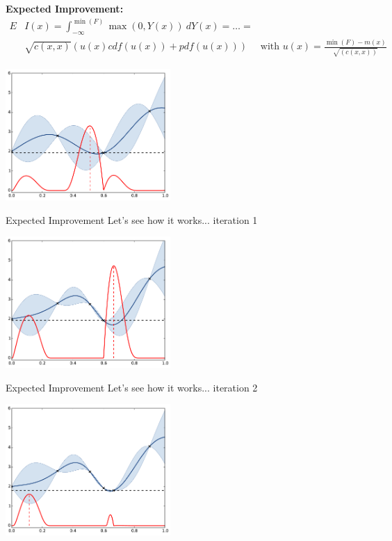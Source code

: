 \begin{frame}{}
\textbf{Expected Improvement:}
\begin{equation*}
\begin{split}
E&I(x) =  \int_{-\infty}^{\min(F)} \max\left(0,Y(x)\right) ~dY(x) = \dots = \\
& \sqrt{c(x,x)} (u(x) cdf(u(x)) + pdf(u(x))) \quad \text{ with } u(x) = \frac{\min(F) - m(x)}{\sqrt{(c(x,x))}}
\end{split}
\end{equation*}
\begin{center}
\includegraphics[height=5cm]{4_optimization/figures/python/ego_EI0}
\end{center}
\end{frame}

\begin{frame}{Expected Improvement}
Let's see how it works... iteration 1
\begin{center}
\includegraphics[height=5cm]{4_optimization/figures/python/ego_EI1}
\end{center}
\end{frame}

\begin{frame}[noframenumbering]{Expected Improvement}
Let's see how it works... iteration 2
\begin{center}
\includegraphics[height=5cm]{4_optimization/figures/python/ego_EI2}
\end{center}
\end{frame}

